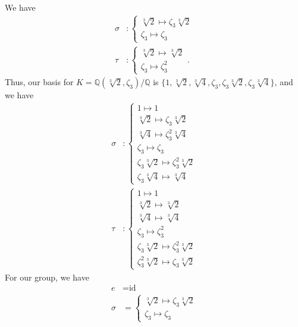 \documentclass[10pt]{extarticle}
\newcommand{\Q}{\mathbb{Q}}
\begin{document}
\begin{enumerate}[(1)]
      We have
      \begin{align*}
        \sigma &:
        \begin{cases}
          \sqrt[3]{2} \mapsto \zeta_3\sqrt[3]{2}\\
          \zeta_{3}\mapsto \zeta_3
        \end{cases}\\
        \tau &: 
        \begin{cases}
          \sqrt[3]{2}\mapsto \sqrt[3]{2}\\
          \zeta_3 \mapsto \zeta_3^2
        \end{cases}.
      \end{align*}
      Thus, our basis for $K = \Q(\sqrt[3]{2},\zeta_3)/\Q$ is $\{1,\sqrt[3]{2},\sqrt[3]{4},\zeta_3,\zeta_3\sqrt[3]{2},\zeta_3\sqrt[3]{4}\}$, and we have
      \begin{align*}
        \sigma &: \begin{cases}
          1 \mapsto 1\\
          \sqrt[3]{2} \mapsto \zeta_3\sqrt[3]{2}\\
          \sqrt[3]{4} \mapsto \zeta_3^2\sqrt[3]{4}\\
          \zeta_3 \mapsto \zeta_3\\
          \zeta_3\sqrt[3]{2} \mapsto \zeta_3^2 \sqrt[3]{2}\\
          \zeta_3\sqrt[3]{4} \mapsto \sqrt[3]{4}
        \end{cases}\\
          \tau &: \begin{cases}
          1 \mapsto 1\\
          \sqrt[3]{2} \mapsto \sqrt[3]{2}\\
          \sqrt[3]{4} \mapsto \sqrt[3]{4}\\
          \zeta_3 \mapsto \zeta_3^2\\
          \zeta_3\sqrt[3]{2} \mapsto \zeta_3^2 \sqrt[3]{2}\\
          \zeta_3^2\sqrt[3]{2} \mapsto \zeta_3\sqrt[3]{2}
          \end{cases}
      \end{align*}
      For our group, we have
      \begin{align*}
        e &= \text{id}\\
        \sigma &=
        \begin{cases}
          \sqrt[3]{2} \mapsto \zeta_3\sqrt[3]{2}\\
          \zeta_{3}\mapsto \zeta_3
        \end{cases}\\

\end{align*}
\end{enumerate}
\end{document}
